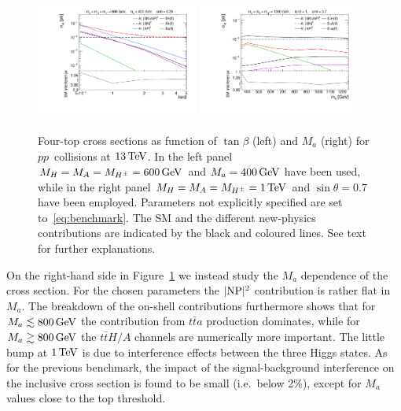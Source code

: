 \documentclass[a4paper, 11pt,notoc]{article}
\newcommand{\mA}{\ensuremath{M_{A}}\xspace}
\newcommand{\ma}{\ensuremath{M_{a}}\xspace}
\newcommand{\mH}{\ensuremath{M_{H}}\xspace}
\newcommand{\mHc}{\ensuremath{M_{H^{\pm}}}\xspace}
\begin{document}
 \begin{figure}[!t]
\centering
\includegraphics[width=0.475\textwidth]{plot_tb.pdf} \quad 
\includegraphics[width=0.475\textwidth]{plot_ma.pdf}
\vspace{4mm}
\caption{\label{fig:4top} Four-top cross sections as function of $\tan \beta$ (left) and $\ma$ (right) for $pp$~collisions at $13 \, {\rm TeV}$.   In the left panel $\mH =\mA=\mHc = 600 \, {\rm GeV}$ and  $\ma = 400 \, {\rm GeV}$ have been used, while in the right panel $\mH =\mA=\mHc = 1 \, {\rm TeV}$ and  $\sin \theta = 0.7$ have been employed. Parameters not explicitly specified are set to~\eqref{eq:benchmark}.  The SM and the different new-physics contributions are indicated by the black and coloured lines. See text for further explanations.}
\end{figure}

On the right-hand side in Figure~\ref{fig:4top} we instead  study the $\ma$ dependence of the cross section. For the chosen parameters the $|{\rm NP}|^2$ contribution is rather flat in $\ma$. The breakdown of the on-shell contributions furthermore shows that for $\ma \lesssim 800 \, {\rm GeV}$ the contribution from $t \bar t a$ production dominates, while for $\ma \gtrsim 800 \, {\rm GeV}$ the $t \bar t H/A$ channels are numerically more important. The little bump at $1 \, {\rm TeV}$ is due to interference effects between the three Higgs states.  As for the previous benchmark,  the impact of the signal-background interference on the inclusive cross section is found to be small (i.e.~below 2\%), except for $\ma$ values close to the top threshold. 
\end{document}
